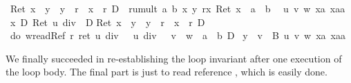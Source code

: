 \begin{isabellebody}
\begin{isamarkuptxt}
      \begin{isabelle}%
{\isasymturnstile}\ Ret\ {\isacharparenleft}x\ {\isasymnoteq}\ y\ {\isasymand}\ y\ {\isasymnoteq}\ r\ {\isasymand}\ x\ {\isasymnoteq}\ r{\isacharparenright}\ {\isasymlongrightarrow}\isactrlsub D\ {\isacharbrackleft}{\isacharhash}\ rumult\ a\ b\ x\ y\ r{\isacharbrackright}{\isacharparenleft}{\isasymlambda}x{\isachardot}\ Ret\ {\isacharparenleft}x\ {\isacharequal}\ a\ {\isacharasterisk}\ b{\isacharparenright}{\isacharparenright}\isanewline
\ {}{\isachardot}\ {\isasymAnd}u\ v\ w\ xa\ xaa{\isachardot}\isanewline
{}\ {\isacharasterisk}x\ {\isacharequal}\isactrlsub D\ Ret\ {\isacharparenleft}u\ div\ {}{\isacharparenright}\ {\isasymand}\isactrlsub D\isanewline
{}Ret\ {\isacharparenleft}x\ {\isasymnoteq}\ y\ {\isasymand}\ y\ {\isasymnoteq}\ r\ {\isasymand}\ x\ {\isasymnoteq}\ r{\isacharparenright}\ {\isasymand}\isactrlsub D\isanewline
{}\ {\isacharparenleft}do\ {\isacharbraceleft}w{\isasymleftarrow}readRef\ r{\isacharsemicolon}\ ret\ {\isacharparenleft}{\isacharparenleft}u\ div\ {}\ {\isacharplus}\ u\ div\ {}{\isacharparenright}\ {\isacharasterisk}\ v\ {\isacharplus}\ w\ {\isacharequal}\ a\ {\isacharasterisk}\ b{\isacharparenright}{\isacharbraceright}{\isacharparenright}\ {\isasymlongrightarrow}\isactrlsub D\isanewline
{}\ y\ {\isacharcolon}{\isacharequal}\ v\ {\isacharasterisk}\ {}{\isacharbrackright}{\isacharquery}B{}{}{}\ u\ v\ w\ xa\ xaa%
\end{isabelle}%
\end{isamarkuptxt}%
\isamarkuptrue%
\isamarkupfalse%
\isamarkupfalse%
\isamarkupfalse%
\isamarkupfalse%
\isamarkupfalse%
\isamarkupfalse%
\isamarkupfalse%
\isamarkupfalse%
\isamarkupfalse%
%
\begin{isamarkuptxt}%
We finally succeeded in re-establishing the loop invariant after one
      execution of the loop
      body. The final part is just to read reference , which is easily done.
      

\end{isamarkuptxt}
\end{isabellebody}
